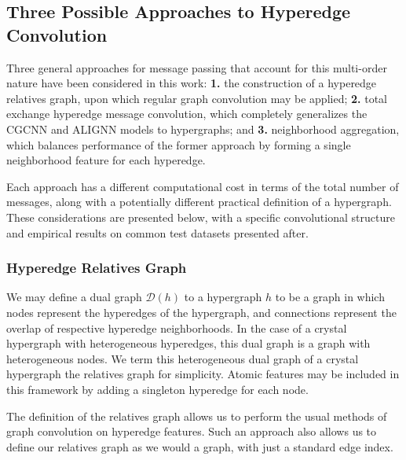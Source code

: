 \documentclass[10pt,a4paper,twocolumn]{article}
\begin{document}
\subsection{Three Possible Approaches to Hyperedge Convolution}

Three general approaches for message passing that account for this multi-order nature have been considered in this work: \textbf{1.} the construction of a hyperedge relatives graph, upon which regular graph convolution may be applied; \textbf{2.} total exchange hyperedge message convolution, which completely generalizes the CGCNN \cite{cgcnn} and ALIGNN \cite{alignn} models to hypergraphs; and \textbf{3.} neighborhood aggregation, which balances performance of the former approach by forming a single neighborhood feature for each hyperedge.

Each approach has a different computational cost in terms of the total number of messages, along with a potentially different practical definition of a hypergraph. These considerations are presented below, with a specific convolutional structure and empirical results on common test datasets presented after.


\subsubsection{Hyperedge Relatives Graph}
We may define a dual graph $\mathcal{D}(h)$ to a hypergraph $h$ to be a graph in which nodes represent the hyperedges of the hypergraph, and connections represent the overlap of respective hyperedge neighborhoods. 
In the case of a crystal hypergraph with heterogeneous hyperedges, this dual graph is a graph with heterogeneous nodes. We term this heterogeneous dual graph of a crystal hypergraph the relatives graph for simplicity. Atomic features may be included in this framework by adding a singleton hyperedge for each node.

The definition of the relatives graph allows us to perform the usual methods of graph convolution on hyperedge features. Such an approach also allows us to define our relatives graph as we would a graph, with just a standard edge index.
\end{document}
